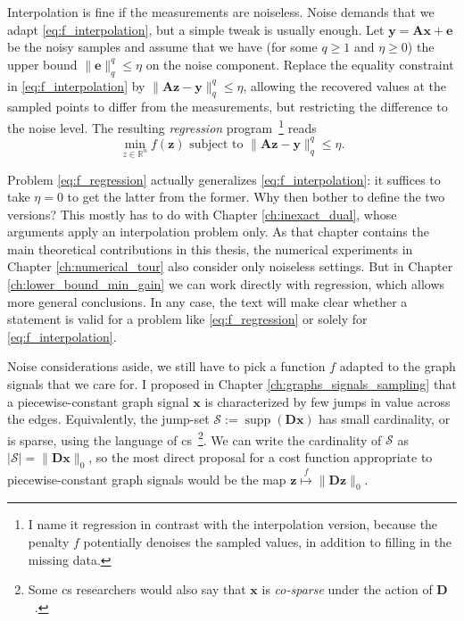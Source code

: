 Interpolation is fine if the measurements are noiseless. Noise demands that we adapt \eqref{eq:f_interpolation}, but a simple tweak is usually enough. Let $\mathbf{y} = \mathbf{Ax} + \mathbf{e}$ be the noisy samples and assume that we have (for some $q \geq 1$ and $\eta \geq 0$) the upper bound $\| \mathbf{e} \|_q^q \leq \eta$ on the noise component. Replace the equality constraint in \eqref{eq:f_interpolation} by $\| \mathbf{Az - y} \|_q^q \leq \eta$, allowing the recovered values at the sampled points to differ from the measurements, but restricting the difference to the noise level. The resulting \emph{regression} program~\footnote{I name it regression in contrast with the interpolation version, because the penalty $f$ potentially denoises the sampled values, in addition to filling in the missing data.} reads
\begin{equation}
    \underset{z \in \mathbb{R}^{n}}{\min} f(\mathbf{z}) \text{ subject to } \| \mathbf{Az - y} \|_q^q \leq \eta. \tag{P$f$-$\eta$} \label{eq:f_regression}
\end{equation}

Problem \eqref{eq:f_regression} actually generalizes \eqref{eq:f_interpolation}: it suffices to take $\eta = 0$ to get the latter from the former. Why then bother to define the two versions? This mostly has to do with Chapter \ref{ch:inexact_dual}, whose arguments apply an interpolation problem only. As that chapter contains the main theoretical contributions in this thesis, the numerical experiments in Chapter \ref{ch:numerical_tour} also consider only noiseless settings. But in Chapter \ref{ch:lower_bound_min_gain} we can work directly with regression, which allows more general conclusions. In any case, the text will make clear whether a statement is valid for a problem like \eqref{eq:f_regression} or solely for \eqref{eq:f_interpolation}.

Noise considerations aside, we still have to pick a function $f$ adapted to the graph signals that we care for. I proposed in Chapter \ref{ch:graphs_signals_sampling} that a piecewise-constant graph signal $\mathbf{x}$ is characterized by few jumps in value across the edges. Equivalently, the jump-set $\mathcal{S} := \operatorname{supp}\left ( \mathbf{Dx} \right )$ has small cardinality, or is sparse, using the language of \acrfull{cs}~\footnote{Some \acrshort{cs} researchers would also say that $\mathbf{x}$ is \emph{co-sparse} under the action of $\mathbf{D}$~\cite{nam2013}.}. We can write the cardinality of $\mathcal{S}$ as $|\mathcal{S}| = \|\mathbf{Dx}\|_0$, so the most direct proposal for a cost function appropriate to piecewise-constant graph signals would be the map $\mathbf{z} \overset{f}{\mapsto} \|\mathbf{Dz}\|_0$.

